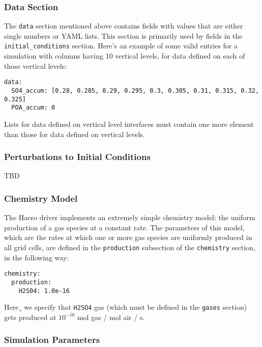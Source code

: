 \subsubsection*{Data Section}

The \texttt{data} section mentioned above contains fields with values that are
either single numbers or YAML lists. This section is primarily used by fields
in the \texttt{initial\_conditions} section. Here's an example of some valid
entries for a simulation with columns having 10 vertical levels, for data
defined on each of those vertical levels:

\begin{verbatim}
data:
  SO4_accum: [0.28, 0.285, 0.29, 0.295, 0.3, 0.305, 0.31, 0.315, 0.32, 0.325]
  POA_accum: 0
\end{verbatim}

Lists for data defined on vertical level interfaces must contain one more
element than those for data defined on vertical levels.

\subsubsection*{Perturbations to Initial Conditions}

TBD

\subsubsection*{Chemistry Model}

The Haero driver implements an extremely simple chemistry model: the uniform
production of a gas species at a constant rate. The parameters of this model,
which are the rates at which one or more gas species are uniformly produced
in all grid cells, are defined in the \texttt{production} subsection of the
\texttt{chemistry} section, in the following way:

\begin{verbatim}
chemistry:
  production:
    H2S04: 1.0e-16
\end{verbatim}

Here¸ we specify that \texttt{H2SO4} gas (which must be defined in the
\texttt{gases} section) gets produced at $ 10^{-16} $ mol gas / mol air / s.

\subsubsection*{Simulation Parameters}

